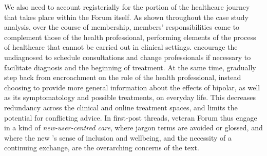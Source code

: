 We also need to account registerially for the portion of the healthcare journey that takes place within the \gls{Forum} itself. As shown throughout the case study analysis, over the course of membership, \glspl{member}' responsibilities come to complement those of the health professional, performing elements of the process of healthcare that cannot be carried out in clinical settings.  encourage the undiagnosed to schedule consultations and change professionals if necessary to facilitate diagnosis and the beginning of treatment. At the same time,  gradually step back from encroachment on the role of the health professional, instead choosing to provide more general information about the effects of \gls{bipolar}, as well as its symptomatology and possible treatments, on everyday life. This decreases redundancy across the clinical and online treatment spaces, and limits the potential for conflicting advice. In first\hyp{}\gls{post} \glspl{thread}, veteran \gls{Forum}  thus engage in a kind of \emph{new\hyp{}user\hyp{}centred care}, where jargon terms are avoided or glossed, and where the new 's sense of inclusion and wellbeing, and the necessity of a continuing exchange, are the overarching concerns of the text. 




